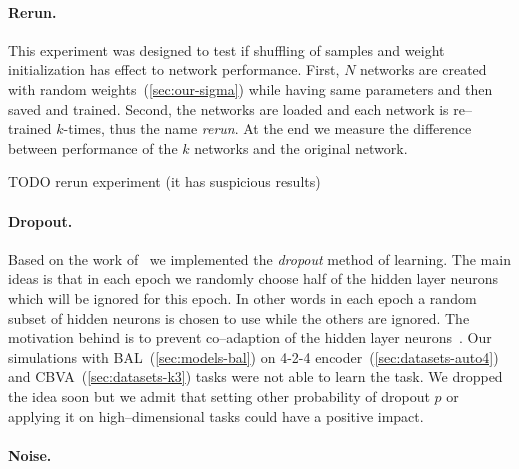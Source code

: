 \paragraph{Rerun.} This experiment was designed to test if shuffling of samples and weight initialization has effect to network performance. First, $N$ networks are created with random weights~(\ref{sec:our-sigma}) while having same parameters and then saved and trained. Second, the networks are loaded and each network is re--trained $k$-times, thus the name \emph{rerun}. At the end we measure the difference between performance of the $k$ networks and the original network. 

TODO rerun experiment (it has suspicious results) 



\paragraph{Dropout.}
Based on the work of~\citet{hinton2012improving} we implemented the \emph{dropout} method of learning. The main ideas is that in each epoch we randomly choose half of the hidden layer neurons which will be ignored for this epoch. In other words in each epoch a random subset of hidden neurons is chosen to use while the others are ignored. The motivation behind is to prevent co--adaption of the hidden layer neurons~\citep{hinton2012improving}. Our simulations with BAL~(\ref{sec:models-bal}) on 4-2-4 encoder~(\ref{sec:datasets-auto4}) and CBVA~(\ref{sec:datasets-k3}) tasks were not able to learn the task. We dropped the idea soon but we admit that setting other probability of dropout $p$ or applying it on high--dimensional tasks could have a positive impact. 

\paragraph{Noise.} 

